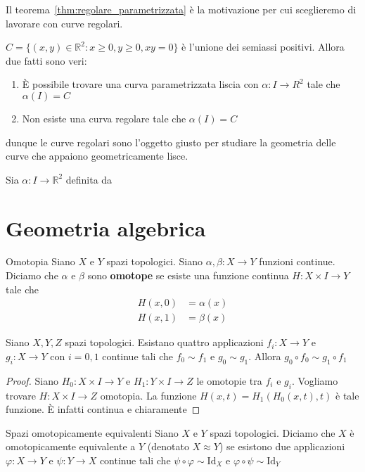 Il teorema~\ref{thm:regolare_parametrizzata} è la motivazione per cui
sceglieremo di lavorare con curve regolari.

\begin{example}
    \(C = \{{(x, y)} \in \mathbb{R}^2 : x \ge 0, y\ge 0, xy=0\}\) è l'unione dei
    semiassi positivi. Allora due fatti sono veri:
\begin{enumerate}[label = \arabic*.]
    \item È possibile trovare una curva parametrizzata liscia con \(\alpha : I
        \to R^2\) tale che \(\alpha{(I)} = C\) 
    \item Non esiste una curva regolare tale che \(\alpha{(I)} = C\)
\end{enumerate}
dunque le curve regolari sono l'oggetto giusto per studiare la geometria delle
curve che appaiono geometricamente lisce.
\end{example}

\begin{example}\label{ex:liscia_angolosa}
    Sia \(\alpha : I \to \mathbb{R}^2\) definita da
\end{example}
    
\chapter{Geometria algebrica}
\begin{definition}{Omotopia}
    Siano \(X\) e \(Y\) spazi topologici. Siano \(\alpha, \beta : X \to Y\)
    funzioni continue. Diciamo che \(\alpha\) e \(\beta\) sono \textbf{omotope}
    se esiste una funzione continua \(H : X \times I \to Y\) tale che
    \begin{align*}
        H{(x, 0)} &= \alpha{(x)} \\
        H{(x, 1)} &= \beta{(x)}
    \end{align*} 
\end{definition}

\begin{proposition}
    Siano \(X, Y, Z\) spazi topologici. Esistano quattro applicazioni \(f_{i} :
    X \to Y\) e \(g_{i}: X \to Y\) con \(i = 0, 1\) continue tali che \(f_{0}
    \sim f_{1}\) e \(g_{0} \sim g_{1}\). Allora \(g_{0} \circ f_{0} \sim g_{1}
    \circ f_{1}\) 
\end{proposition}
\begin{proof}
    Siano \(H_{0} : X \times I \to Y\)  e \(H_{1} : Y \times I \to Z\) le
    omotopie tra \(f_{i}\) e \(g_{i}\). Vogliamo trovare \(H : X \times I \to Z\)
    omotopia. La funzione \(H(x, t) = H_{1}(H_{0}{(x, t)}, t)\) è tale funzione.
    È infatti continua e chiaramente %
\end{proof}
\begin{definition}{Spazi omotopicamente equivalenti}
    Siano \(X\) e \(Y\) spazi topologici. Diciamo che \(X\) è omotopicamente
    equivalente a \(Y\) (denotato \(X \approx Y\)) se esistono due applicazioni
    \(\varphi : X \to Y\) e \(\psi : Y \to  X\) continue tali che \(\psi \circ
    \varphi \sim \mathrm{Id}_X\) e \(\varphi \circ \psi \sim \mathrm{Id}_Y\) 
\end{definition}

